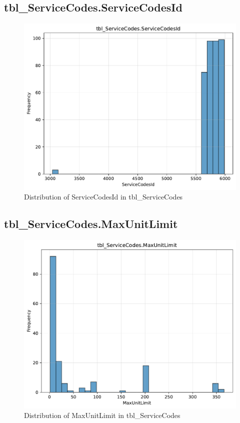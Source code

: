 \subsection{tbl\_ServiceCodes.ServiceCodesId}

\begin{figure}[htbp]
\centering
\includegraphics[width=\textwidth]{figures/dbo_tbl_ServiceCodes_ServiceCodesId.pdf}
\caption{Distribution of ServiceCodesId in tbl\_ServiceCodes}
\end{figure}\newpage

\subsection{tbl\_ServiceCodes.MaxUnitLimit}

\begin{figure}[htbp]
\centering
\includegraphics[width=\textwidth]{figures/dbo_tbl_ServiceCodes_MaxUnitLimit.pdf}
\caption{Distribution of MaxUnitLimit in tbl\_ServiceCodes}
\end{figure}\newpage

